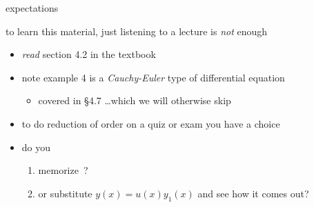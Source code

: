 \documentclass[dvipsnames]{beamer}
\begin{document}
\begin{frame}{expectations}

to learn this material, just listening to a lecture is \emph{not} enough
     \begin{itemize}
     \item \emph{read} section 4.2 in the textbook
     
\item note example 4 is a \emph{Cauchy-Euler} type of differential equation
     \begin{itemize}
     \item covered in \S 4.7 \dots which we will otherwise skip
     \end{itemize}
\item to do reduction of order on a quiz or exam you have a \alert{choice}
\item do you
     \begin{enumerate}
     \item memorize \,?

\medskip
     \item or substitute $y(x) = u(x) y_1(x)$ and see how it comes out?
     \end{enumerate}
     \end{itemize}
\end{frame}
\end{document}
